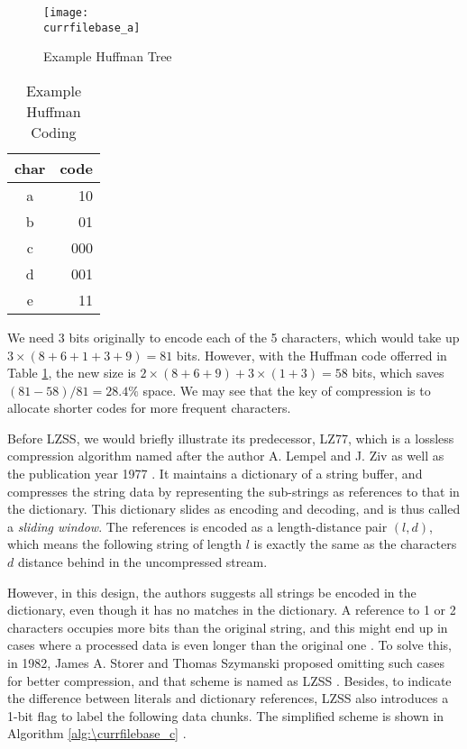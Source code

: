 \documentclass[catalog.tex]{subfiles}
\begin{document}
\begin{figure}[!htb]
    \centering
    \texttt{[image: \\currfilebase\_a]}
    \caption{Example Huffman Tree}
    \label{fig:\currfilebase_a}
\end{figure}

\begin{table}[!htb]
    \centering
    \begin{tabular}{cr}
        \toprule
        char & code \\
        \midrule
        a & 10 \\
        b & 01 \\
        c & 000 \\
        d & 001 \\
        e & 11 \\
        \bottomrule
    \end{tabular}
    \caption{Example Huffman Coding}
	\label{tbl:\currfilebase_b}
\end{table}

We need 3 bits originally to encode each of the 5 characters, which would take up $3\times(8+6+1+3+9)=81$ bits. However, with the Huffman code offerred in Table \ref{tbl:\currfilebase_b}, the new size is $2\times(8+6+9)+3\times(1+3)=58$ bits, which saves $(81-58)/81=28.4\%$ space. We may see that the key of compression is to allocate shorter codes for more frequent characters.

Before LZSS, we would briefly illustrate its predecessor, LZ77, which is a lossless compression algorithm named after the author A. Lempel and J. Ziv as well as the publication year 1977 \cite{ziv1977universal}. It maintains a dictionary of a string buffer, and compresses the string data by representing the sub-strings as references to that in the dictionary. This dictionary slides as encoding and decoding, and is thus called a \textit{sliding window}. The references is encoded as a length-distance pair $(l,d)$, which means the following string of length $l$ is exactly the same as the characters $d$ distance behind in the uncompressed stream.

However, in this design, the authors suggests all strings be encoded in the dictionary, even though it has no matches in the dictionary. A reference to 1 or 2 characters occupies more bits than the original string, and this might end up in cases where a processed data is even longer than the original one \cite{michaellz77}. To solve this, in 1982, James A. Storer and Thomas Szymanski proposed omitting such cases for better compression, and that scheme is named as LZSS \cite{storer1982data}. Besides, to indicate the difference between literals and dictionary references, LZSS also introduces a 1-bit flag to label the following data chunks. The simplified scheme is shown in Algorithm \ref{alg:\currfilebase_c} \cite{michaellz77}.
\end{document}
